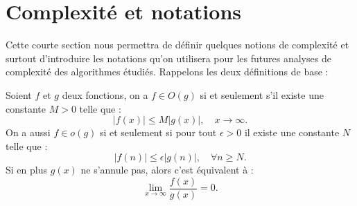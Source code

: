 \documentclass[a4paper]{article} %
\numberwithin{section}{part}
\numberwithin{equation}{section}
\begin{document}
\section{Complexité et notations}
Cette courte section nous permettra de définir quelques notions de complexité
et surtout d'introduire les notations qu'on utilisera pour les futures analyses
de complexité des algorithmes étudiés. Rappelons les deux définitions de base :

\begin{defn}
Soient $f$ et $g$ deux fonctions, on a $f\in O(g)$ si et seulement s'il existe 
une constante $M>0$ telle que :
\begin{equation}
    \vert{f(x)}\vert \leq M\vert{g(x)}\vert,\quad x\to\infty.
\end{equation}
On a aussi $f\in o(g)$ si et seulement si pour tout $\epsilon>0$ il existe une 
constante $N$ telle que :
\begin{equation}
    \vert{f(n)}\vert\leq\epsilon\vert{g(n)}\vert,\quad\forall n\geq N.
\end{equation}
Si en plus $g(x)$ ne s'annule pas, alors c'est équivalent à :
\begin{equation}
    \lim_{x\to\infty}{\frac{f(x)}{g(x)}} = 0.
\end{equation}
\end{defn}
\end{document}
